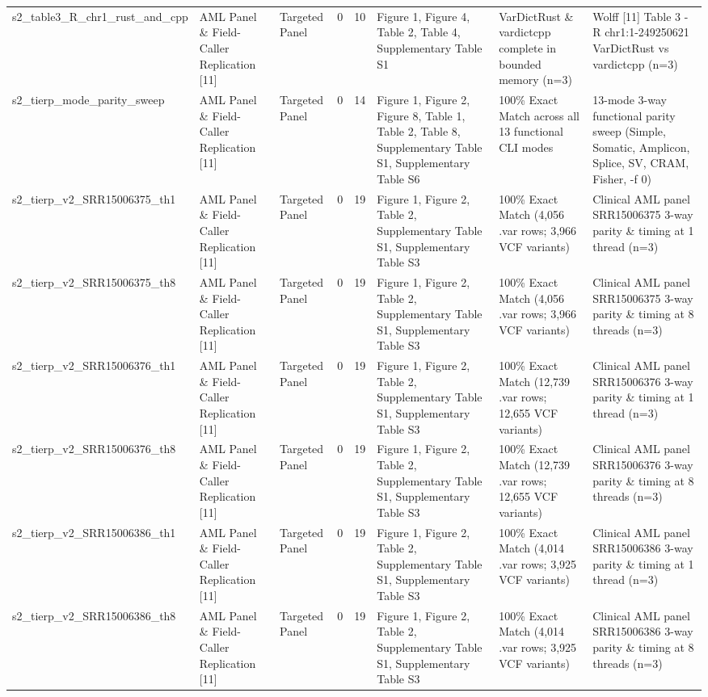 \begin{table}[htbp]
{\begin{tabular}{llllllll}
s2\_table3\_R\_chr1\_rust\_and\_cpp & AML Panel \& Field-Caller Replication [11] & Targeted Panel & 0 & 10 & Figure 1, Figure 4, Table 2, Table 4, Supplementary Table S1 & VarDictRust \& vardictcpp complete in bounded memory (n=3) & Wolff [11] Table 3 -R chr1:1-249250621 VarDictRust vs vardictcpp (n=3) \\
s2\_tierp\_mode\_parity\_sweep & AML Panel \& Field-Caller Replication [11] & Targeted Panel & 0 & 14 & Figure 1, Figure 2, Figure 8, Table 1, Table 2, Table 8, Supplementary Table S1, Supplementary Table S6 & 100\% Exact Match across all 13 functional CLI modes & 13-mode 3-way functional parity sweep (Simple, Somatic, Amplicon, Splice, SV, CRAM, Fisher, -f 0) \\
s2\_tierp\_v2\_SRR15006375\_th1 & AML Panel \& Field-Caller Replication [11] & Targeted Panel & 0 & 19 & Figure 1, Figure 2, Table 2, Supplementary Table S1, Supplementary Table S3 & 100\% Exact Match (4,056 .var rows; 3,966 VCF variants) & Clinical AML panel SRR15006375 3-way parity \& timing at 1 thread (n=3) \\
s2\_tierp\_v2\_SRR15006375\_th8 & AML Panel \& Field-Caller Replication [11] & Targeted Panel & 0 & 19 & Figure 1, Figure 2, Table 2, Supplementary Table S1, Supplementary Table S3 & 100\% Exact Match (4,056 .var rows; 3,966 VCF variants) & Clinical AML panel SRR15006375 3-way parity \& timing at 8 threads (n=3) \\
s2\_tierp\_v2\_SRR15006376\_th1 & AML Panel \& Field-Caller Replication [11] & Targeted Panel & 0 & 19 & Figure 1, Figure 2, Table 2, Supplementary Table S1, Supplementary Table S3 & 100\% Exact Match (12,739 .var rows; 12,655 VCF variants) & Clinical AML panel SRR15006376 3-way parity \& timing at 1 thread (n=3) \\
s2\_tierp\_v2\_SRR15006376\_th8 & AML Panel \& Field-Caller Replication [11] & Targeted Panel & 0 & 19 & Figure 1, Figure 2, Table 2, Supplementary Table S1, Supplementary Table S3 & 100\% Exact Match (12,739 .var rows; 12,655 VCF variants) & Clinical AML panel SRR15006376 3-way parity \& timing at 8 threads (n=3) \\
s2\_tierp\_v2\_SRR15006386\_th1 & AML Panel \& Field-Caller Replication [11] & Targeted Panel & 0 & 19 & Figure 1, Figure 2, Table 2, Supplementary Table S1, Supplementary Table S3 & 100\% Exact Match (4,014 .var rows; 3,925 VCF variants) & Clinical AML panel SRR15006386 3-way parity \& timing at 1 thread (n=3) \\
s2\_tierp\_v2\_SRR15006386\_th8 & AML Panel \& Field-Caller Replication [11] & Targeted Panel & 0 & 19 & Figure 1, Figure 2, Table 2, Supplementary Table S1, Supplementary Table S3 & 100\% Exact Match (4,014 .var rows; 3,925 VCF variants) & Clinical AML panel SRR15006386 3-way parity \& timing at 8 threads (n=3) \\

\end{tabular}}
\end{table}
